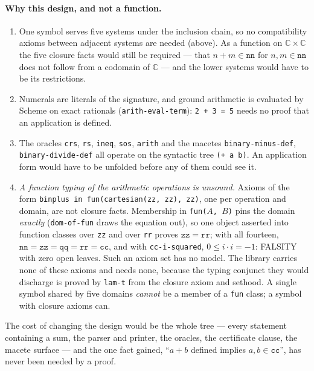 \paragraph{Why this design, and not a function.}
\begin{enumerate}
\item One symbol serves five systems under the inclusion chain, so no
  compatibility axioms between adjacent systems are needed (above).  As a
  function on $\mathbb{C} \times \mathbb{C}$ the five closure facts would
  still be required --- that $n + m \in \mathtt{nn}$ for $n, m \in \mathtt{nn}$
  does not follow from a codomain of $\mathbb{C}$ --- and the lower systems
  would have to be its restrictions.
\item Numerals are literals of the signature, and ground arithmetic is
  evaluated by Scheme on exact rationals (\texttt{arith-eval-term}):
  \texttt{2 + 3 = 5} needs no proof that an application is defined.
\item The oracles \texttt{crs}, \texttt{rs}, \texttt{ineq}, \texttt{sos},
  \texttt{arith} and the macetes \texttt{binary-minus-def},
  \texttt{binary-divide-def} all operate on the syntactic tree
  \texttt{(+ a b)}.  An application form would have to be unfolded before
  any of them could see it.
\item \emph{A function typing of the arithmetic operations is unsound.}  Axioms of the form
  \texttt{binplus in fun(cartesian(zz, zz), zz)}, one per operation and
  domain, are not closure facts.
  Membership in \texttt{fun($A$, $B$)} pins the domain \emph{exactly}
  (\texttt{dom-of-fun} draws the equation out), so one object asserted into
  function classes over \texttt{zz} and over \texttt{rr} proves
  $\mathtt{zz} = \mathtt{rr}$; with all fourteen, $\mathtt{nn} = \mathtt{zz} =
  \mathtt{qq} = \mathtt{rr} = \mathtt{cc}$, and with \texttt{cc-i-squared},
  $0 \le i \cdot i = -1$: FALSITY with zero open leaves.  Such an axiom set
  has no model.  The library carries none of these axioms and needs none,
  because the typing conjunct they would discharge is proved by
  \texttt{lam-t} from the closure axiom and sethood.
  A single symbol shared by five domains \emph{cannot} be a member of a
  \texttt{fun} class; a symbol with closure axioms can.
\end{enumerate}
The cost of changing the design would be the whole tree --- every statement
containing a sum, the parser and printer, the oracles, the certificate
clause, the macete surface --- and the one fact gained, ``$a + b$ defined
implies $a, b \in \mathtt{cc}$'', has never been needed by a proof.

